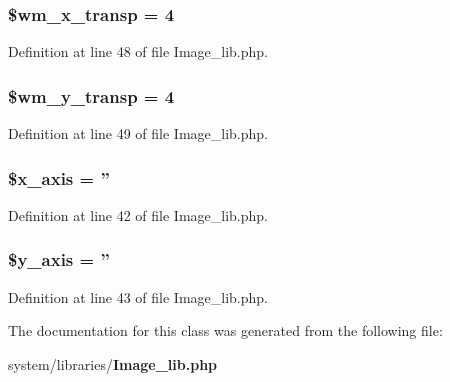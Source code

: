\subsubsection[{\$wm\-\_\-x\-\_\-transp}]{\setlength{\rightskip}{0pt plus 5cm}\$wm\-\_\-x\-\_\-transp = 4}\label{class_c_i___image__lib_a720496900551e5c29b11a732fb4f35ab}


Definition at line 48 of file Image\-\_\-lib.\-php.

\subsubsection[{\$wm\-\_\-y\-\_\-transp}]{\setlength{\rightskip}{0pt plus 5cm}\$wm\-\_\-y\-\_\-transp = 4}\label{class_c_i___image__lib_aa9ab81b196739723a7c38d9431c9fa11}


Definition at line 49 of file Image\-\_\-lib.\-php.

\subsubsection[{\$x\-\_\-axis}]{\setlength{\rightskip}{0pt plus 5cm}\$x\-\_\-axis = ''}\label{class_c_i___image__lib_a128914b11765a500690f876962196ca6}


Definition at line 42 of file Image\-\_\-lib.\-php.

\subsubsection[{\$y\-\_\-axis}]{\setlength{\rightskip}{0pt plus 5cm}\$y\-\_\-axis = ''}\label{class_c_i___image__lib_ac60512307da37068c0821f7dc2488608}


Definition at line 43 of file Image\-\_\-lib.\-php.



The documentation for this class was generated from the following file\-:\begin{DoxyCompactItemize}
\item 
system/libraries/{\bf Image\-\_\-lib.\-php}\end{DoxyCompactItemize}
